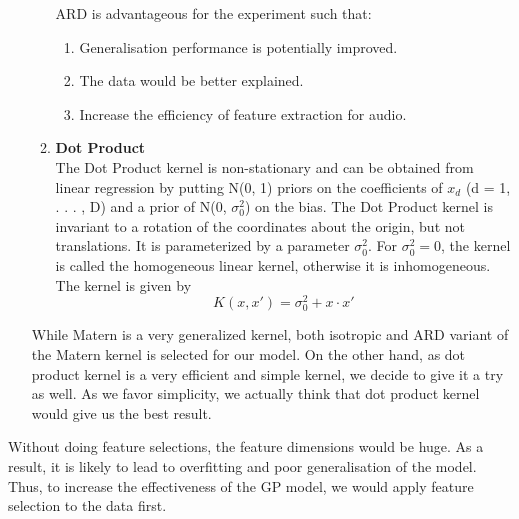\documentclass{article}
\begin{document}
\begin{enumerate}
\begin{enumerate}
			ARD is advantageous for the experiment such that: \cite{Cawley2014}
			\begin{enumerate}
				\item Generalisation performance is potentially improved.
				\item The data would be better explained.
				\item Increase the efficiency of feature extraction for audio.
			\end{enumerate}
			
			\item \textbf{Dot Product}\\
			The Dot Product kernel is non-stationary and can be obtained from linear regression by putting N(0, 1) priors on the coefficients 
			of \(x_{d}\) (d = 1, . . . , D) and a prior of N(0, \(\sigma_{0}^{2}\)) on the bias. 
			The Dot Product kernel is invariant to a rotation of the coordinates about the origin, but not translations. 
			It is parameterized by a parameter \(\sigma_{0}^{2}\). For \(\sigma_{0}^{2} = 0\), 
			the kernel is called the homogeneous linear kernel, otherwise it is inhomogeneous. The kernel is given by
			\begin{equation}\label{eq:kernel_dp}
				K(x,x') = \sigma_{0}^{2} + x \cdot x'  
			\end{equation}
		\end{enumerate}

		While Matern is a very generalized kernel, both isotropic and ARD variant of the Matern kernel is selected for our model. 
		On the other hand, as dot product kernel is a very efficient and simple kernel, we decide to give it a try as well. 
		As we favor simplicity, we actually think that dot product kernel would give us the best result.
	\end{enumerate}

	Without doing feature selections, the feature dimensions would be huge. 
	As a result, it is likely to lead to overfitting and poor generalisation of the model. \cite{Cawley2014} 
	Thus, to increase the effectiveness of the GP model, we would apply feature selection to the data first.
\end{document}
